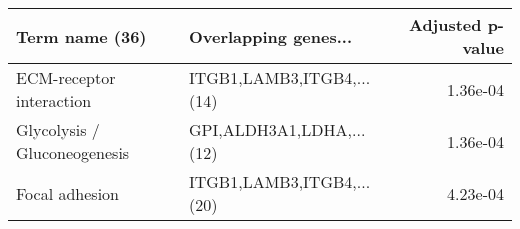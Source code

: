 \begin{tabular}{llr}
\toprule
              Term name (36) &      Overlapping genes... &  Adjusted p-value \\
\midrule
    ECM-receptor interaction & ITGB1,LAMB3,ITGB4,...(14) &          1.36e-04 \\
Glycolysis / Gluconeogenesis &  GPI,ALDH3A1,LDHA,...(12) &          1.36e-04 \\
              Focal adhesion & ITGB1,LAMB3,ITGB4,...(20) &          4.23e-04 \\
\bottomrule
\end{tabular}
